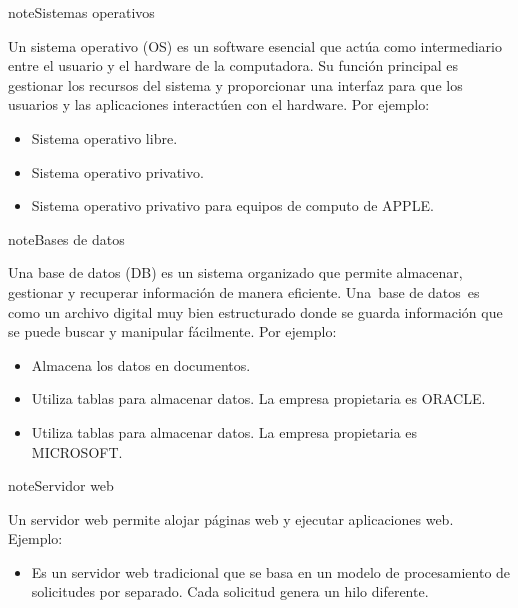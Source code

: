 \documentclass[letterpaper,10pt,spanish]{sphinxmanual}
\begin{document}
\begin{sphinxadmonition}{note}{Sistemas operativos}

\sphinxAtStartPar
Un sistema operativo (OS) es un software esencial que actúa como intermediario entre el usuario y el hardware de la computadora. Su función principal es gestionar los recursos del sistema y proporcionar una interfaz para que los usuarios y las aplicaciones interactúen con el hardware. Por ejemplo:
\begin{itemize}
\item {} 
\sphinxAtStartPar
{} Sistema operativo libre.

\item {} 
\sphinxAtStartPar
{} Sistema operativo privativo.

\item {} 
\sphinxAtStartPar
{} Sistema operativo privativo para equipos de computo de APPLE.

\end{itemize}
\end{sphinxadmonition}

\begin{sphinxadmonition}{note}{Bases de datos}

\sphinxAtStartPar
Una base de datos (DB) es un sistema organizado que permite almacenar, gestionar y recuperar información de manera eficiente. Una base de datos es como un archivo digital muy bien estructurado donde se guarda información que se puede buscar y manipular fácilmente. Por ejemplo:
\begin{itemize}
\item {} 
\sphinxAtStartPar
{} Almacena los datos en documentos.

\item {} 
\sphinxAtStartPar
{} Utiliza tablas para almacenar datos. La empresa propietaria es ORACLE.

\item {} 
\sphinxAtStartPar
{} Utiliza tablas para almacenar datos. La empresa propietaria es MICROSOFT.

\end{itemize}
\end{sphinxadmonition}

\begin{sphinxadmonition}{note}{Servidor web}

\sphinxAtStartPar
Un servidor web permite alojar páginas web y ejecutar aplicaciones web. Ejemplo:
\begin{itemize}
\item {} 
\sphinxAtStartPar
{} Es un servidor web tradicional que se basa en un modelo de procesamiento de solicitudes por separado. Cada solicitud genera un hilo diferente.

\end{itemize}
\end{sphinxadmonition}
\end{document}
